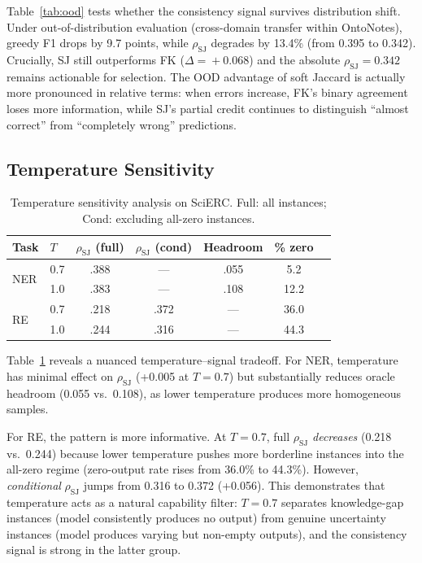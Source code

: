 \documentclass[11pt,a4paper]{article}
\newcommand{\rhosj}{\rho_{\mathrm{SJ}}}
\begin{document}
Table~\ref{tab:ood} tests whether the consistency signal survives distribution shift. Under out-of-distribution evaluation (cross-domain transfer within OntoNotes), greedy F1 drops by 9.7 points, while $\rhosj$ degrades by 13.4\% (from 0.395 to 0.342). Crucially, SJ still outperforms FK ($\Delta\!=\!+0.068$) and the absolute $\rhosj\!=\!0.342$ remains actionable for selection. The OOD advantage of soft Jaccard is actually more pronounced in relative terms: when errors increase, FK's binary agreement loses more information, while SJ's partial credit continues to distinguish ``almost correct'' from ``completely wrong'' predictions.

\subsection{Temperature Sensitivity}
\label{sec:temperature}

\begin{table}[t]
\centering
\caption{Temperature sensitivity analysis on SciERC. Full: all instances; Cond: excluding all-zero instances.}
\label{tab:temperature}
\small
\begin{tabular}{llccccc}
\toprule
\textbf{Task} & \textbf{$T$} & \textbf{$\rhosj$ (full)} & \textbf{$\rhosj$ (cond)} & \textbf{Headroom} & \textbf{\% zero} \\
\midrule
\multirow{2}{*}{NER} & 0.7 & .388 & --- & .055 & 5.2 \\
                      & 1.0 & .383 & --- & .108 & 12.2 \\
\midrule
\multirow{2}{*}{RE}  & 0.7 & .218 & .372 & --- & 36.0 \\
                      & 1.0 & .244 & .316 & --- & 44.3 \\
\bottomrule
\end{tabular}
\end{table}

Table~\ref{tab:temperature} reveals a nuanced temperature--signal tradeoff. For NER, temperature has minimal effect on $\rhosj$ (+0.005 at $T\!=\!0.7$) but substantially reduces oracle headroom (0.055 vs.\ 0.108), as lower temperature produces more homogeneous samples.

For RE, the pattern is more informative. At $T\!=\!0.7$, full $\rhosj$ \emph{decreases} (0.218 vs.\ 0.244) because lower temperature pushes more borderline instances into the all-zero regime (zero-output rate rises from 36.0\% to 44.3\%). However, \emph{conditional} $\rhosj$ jumps from 0.316 to 0.372 (+0.056). This demonstrates that temperature acts as a natural capability filter: $T\!=\!0.7$ separates knowledge-gap instances (model consistently produces no output) from genuine uncertainty instances (model produces varying but non-empty outputs), and the consistency signal is strong in the latter group.
\end{document}
